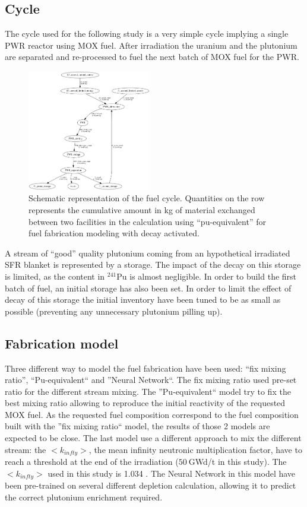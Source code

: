 \documentclass{anstrans}
\begin{document}
\subsection{Cycle}
The cycle used for the following study is a very simple cycle implying a single
PWR reactor using MOX fuel. After irradiation the uranium and the plutonium are
separated and re-processed to fuel the next batch of MOX fuel for the PWR.

\begin{figure}[ht] %
  \centering
  \includegraphics[width=0.48\textwidth]{flow}
  \caption{Schematic representation of the fuel cycle. Quantities on the row
  represents the cumulative amount in kg of material exchanged between two
facilities in the calculation using ``pu-equivalent'' for fuel fabrication
modeling with decay activated.}
  \label{fig:flow}
\end{figure}

A stream of ``good'' quality plutonium coming from an hypothetical irradiated
SFR blanket is represented by a storage. The impact of the decay on this storage
is limited, as the content in $^{241}$Pu is almost negligible.  In order to
build the first batch of fuel, an initial storage has also been set.  In order
to limit the effect of decay of this storage the initial inventory have been
tuned to be as small as possible (preventing any unnecessary plutonium pilling
up).

\subsection{Fabrication model}
Three different way to model the fuel fabrication have been used: ``fix mixing
ratio'', ``Pu-equivalent`` and ''Neural Network``.
The fix mixing ratio used pre-set ratio for the different stream mixing. The
''Pu-equivalent`` model try to fix the best mixing ratio allowing to reproduce
the initial reactivity of the requested MOX fuel. As the requested fuel
composition correspond to the fuel composition built with the ''fix mixing
ratio`` model, the results of those 2 models are expected to be close.
The last model use a different approach to mix the different stream: the
$<k_{infty}>$, the mean infinity neutronic multiplication factor, have to reach
a threshold at the end of the irradiation ($50~$GWd/t in this study). The
$<k_{infty}>$ used in this study is 1.034 \cite{???}. The Neural Network in this
model have been pre-trained on several different depletion calculation,
allowing it to predict the correct plutonium enrichment required.
\end{document}
